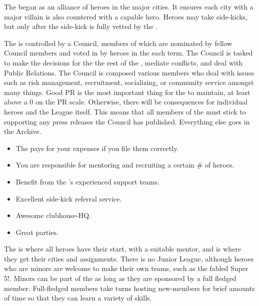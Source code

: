 \documentclass[blue]{LRSguildcamp1}
\begin{document}
\name{\bHeroLeague{}}


The \cHeroLeague{\intro} began as an alliance of heroes in the major cities. It ensures each city with a major villain is also countered with a capable hero. Heroes may take side-kicks, but only after the side-kick is fully vetted by the \cHeroLeague{}. 

The \cHeroLeague{} is controlled by a Council, members of which are nominated by fellow Council members and voted in by heroes in the \cHeroLeague{} each term. The Council is tasked to make the decisions for the the rest of the \cHeroLeague{}, mediate conflicts, and deal with Public Relations. The Council is composed various members who deal with issues such as risk management, recruitment, socializing, or community service amongst many things. Good PR is the most important thing for the \cHeroLeague{} to maintain, at least above a 0 on the PR scale. Otherwise, there will be consequences for individual heroes and the League itself. This means that all members of the \cHeroLeague{} must stick to supporting any press releases the Council has published. Everything else goes in the \cHeroLeague{} Archive.

\begin{itemize}
\item The \cHeroLeague{} pays for your expenses if you file them correctly. 
\item You are responsible for mentoring and recruiting a certain # of heroes.
\item Benefit from the \cHeroLeague{}'s experienced support teams.
\item Excellent side-kick referral service. 
\item Awesome clubhouse-HQ.
\item Great parties.
\end{itemize}

The \cHeroLeague{} is where all heroes have their start, with a suitable mentor, and is where they get their cities and assignments. There is no Junior League, although heroes who are minors are welcome to make their own teams, such as the fabled Super 5!.  Minors can be part of the \cHeroLeague{} as long as they are sponsored by a full fledged member. Full-fledged members take turns hosting new-members for brief amounts of time so that they can learn a variety of skills. 
\end{document}
